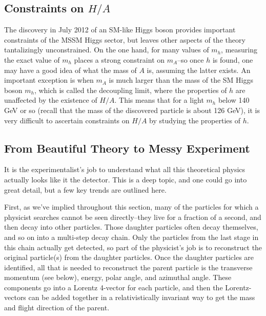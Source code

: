 \subsection{Constraints on $H/A$}
The discovery in July 2012 of an SM-like Higgs boson provides important constraints of the MSSM Higgs sector, but leaves other aspects of the theory tantalizingly unconstrained.  On the one hand, for many values of $m_h$, measuring the exact value of $m_h$ places a strong constraint on $m_A$--so once $h$ is found, one may have a good idea of what the mass of $A$ is, assuming the latter exists.  An important exception is when $m_A$ is much larger than the mass of the SM Higgs boson $m_h$, which is called the decoupling limit, where the properties of $h$ are unaffected by the existence of $H/A$.  This means that for a light $m_h$ below 140 GeV or so (recall that the mass of the discovered particle is about 126 GeV), it is very difficult to ascertain constraints on $H/A$ by studying the properties of $h$.   


\subsection{From Beautiful Theory to Messy Experiment}

It is the experimentalist's job to understand what all this theoretical physics actually looks like it the detector.  This is a deep topic, and one could go into great detail, but a few key trends are outlined here.

First, as we've implied throughout this section, many of the particles for which a physicist searches cannot be seen directly--they live for a fraction of a second, and then decay into other particles.  Those daughter particles often decay themselves, and so on into a  multi-step decay chain.  Only the particles from the last stage in this chain actually get detected, so part of the physicist's job is to reconstruct the original particle(s) from the daughter particles.  Once the daughter particles are identified, all that is needed to reconstruct the parent particle is the transverse momentum (see below), energy, polar angle, and azimuthal angle.  These components go into a Lorentz 4-vector for each particle, and then the Lorentz-vectors can be added together in a relativistically invariant way to get the mass and flight direction of the parent.

